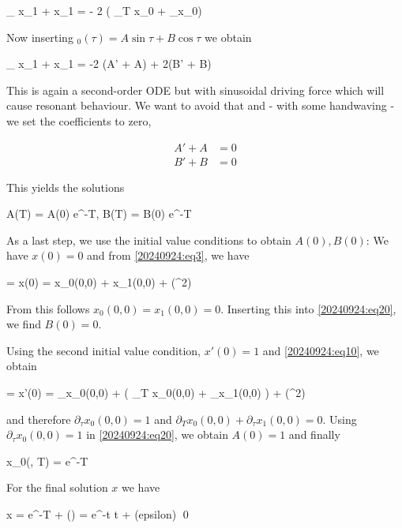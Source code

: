 \bee
\partial_{\tau \tau} x_1 + x_1 = - 2 ( \partial_{T \tau} x_0 + \partial_\tau x_0)
\eee

Now inserting $_0(\tau) = A \sin \tau + B \cos \tau$ we obtain

\bee
\partial_{\tau \tau} x_1 + x_1 = -2 (A' + A) \cos \tau + 2(B' + B) \sin \tau
\eee

This is again a second-order ODE but with sinusoidal driving force which will cause resonant behaviour. We want to avoid that and - with some handwaving - we set the coefficients to zero,

\begin{align*}
    A' + A &= 0 \\
    B' + B &= 0
\end{align*}

This yields the solutions

\be\label{20240924:eq20}
A(T) = A(0) e^{-T}, \quad B(T) = B(0) e^{-T}
\ee

As a last step, we use the initial value conditions to obtain $A(0), B(0)$: We have $x(0) = 0$ and from \eqref{20240924:eq3}, we have 

 = x(0) = x_0(0,0) + \epsilon x_1(0,0) + \Oc(\epsilon^2)
\eee

From this follows $x_0(0,0) = x_1(0,0) = 0$. Inserting this into \eqref{20240924:eq20}, we find $B(0) = 0$.

Using the second initial value condition, $x'(0) = 1$ and \eqref{20240924:eq10}, we obtain

 = x'(0) = \partial_\tau x_0(0,0) + \epsilon ( \partial_T x_0(0,0) + \partial_\tau x_1(0,0) ) + \Oc(\epsilon^2)
\eee

and therefore $\partial_\tau x_0(0,0) = 1$ and $\partial_T x_0(0,0) + \partial_\tau x_1(0,0) = 0$. Using $\partial_\tau x_0(0,0) = 1$ in \eqref{20240924:eq20}, we obtain $A(0) = 1$ and finally

\bee
x_0(\tau, T) = e^{-T} \sin \tau
\eee

For the final solution $x$ we have

\bee
x = e^{-T} \sin \tau + \Oc(\epsilon) = e^{-\epsilon t} \sin t + \Oc(epsilon) \qed
\eee


